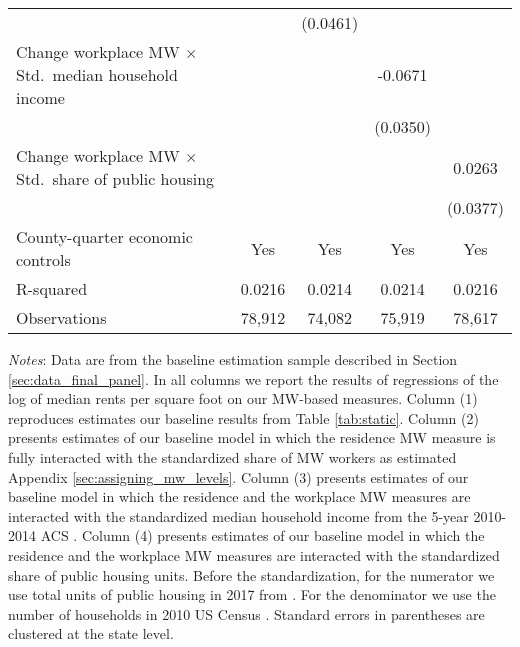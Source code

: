 \begin{landscape}
\begin{table}[hbt!]
\begin{tabular}{@{}lcccc@{}}
                                                                  &        & (0.0461) &        &        \\
        Change workplace MW $\times$ Std.\ median household income&        &       &  -0.0671   &        \\
                                                                  &        &       & (0.0350)  &        \\
        Change workplace MW $\times$ Std.\ share of public housing&        &       &        &  0.0263   \\
                                                                  &        &       &        & (0.0377)  \\ \midrule
        County-quarter economic controls                          &  Yes   &  Yes  &   Yes  &  Yes   \\
        R-squared                                                 &  0.0216   &  0.0214  &   0.0214  &  0.0216   \\
        Observations                                              &  78,912  &  74,082 &   75,919 &  78,617  \\ \bottomrule
    \end{tabular}

    \begin{minipage}{.95\linewidth} \footnotesize
        \vspace{2mm}
        \textit{Notes}: 
        Data are from the baseline estimation sample described in Section 
        \ref{sec:data_final_panel}.
        In all columns we report the results of regressions of the log of median 
        rents per square foot on our MW-based measures.
        Column (1) reproduces estimates our baseline results from Table 
        \ref{tab:static}.
        Column (2) presents estimates of our baseline model in which the 
        residence MW measure is fully interacted with the standardized share of 
        MW workers as estimated Appendix \ref{sec:assigning_mw_levels}.
        Column (3) presents estimates of our baseline model in which the 
        residence and the workplace MW measures are interacted with the 
        standardized median household income from the 5-year 2010-2014 ACS 
        \parencite{CensusACS}.
        Column (4) presents estimates of our baseline model in which the 
        residence and the workplace MW measures are interacted with the 
        standardized share of public housing units.
        Before the standardization, for the numerator we use total units of 
        public housing in 2017 from \textcite{hudHousing}.
        For the denominator we use the number of households in 2010 US Census 
        \parencite{CensusDecennial}.
        Standard errors in parentheses are clustered at the state level.
    \end{minipage}
\end{table}
\end{landscape}
